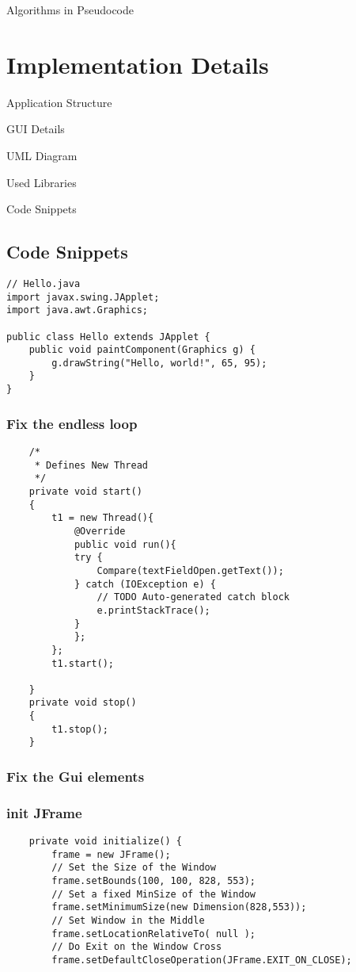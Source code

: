 \documentclass[10pt,a4paper]{article}
\begin{document}
Algorithms in Pseudocode


\section{Implementation Details}


 Application Structure

     GUI Details

     UML Diagram

     Used Libraries

     Code Snippets
     
     
 \subsection{Code Snippets}
 \begin{lstlisting}
// Hello.java
import javax.swing.JApplet;
import java.awt.Graphics;

public class Hello extends JApplet {
    public void paintComponent(Graphics g) {
        g.drawString("Hello, world!", 65, 95);
    }    
}
\end{lstlisting}

\subsubsection{Fix the endless loop}


\begin{lstlisting}
	/*
	 * Defines New Thread 
	 */
	private void start() 
	{
		t1 = new Thread(){
			@Override
			public void run(){
			try {
				Compare(textFieldOpen.getText());
			} catch (IOException e) {
				// TODO Auto-generated catch block
				e.printStackTrace();
			}
			};
		};
		t1.start();
		
	}
	private void stop()
	{
		t1.stop();
	}
\end{lstlisting}
\subsubsection{Fix the Gui elements}
\subsubsection*{init JFrame}
\begin{lstlisting}
	private void initialize() {
		frame = new JFrame();
		// Set the Size of the Window
		frame.setBounds(100, 100, 828, 553);
		// Set a fixed MinSize of the Window
		frame.setMinimumSize(new Dimension(828,553));			
		// Set Window in the Middle
		frame.setLocationRelativeTo( null );			
		// Do Exit on the Window Cross
		frame.setDefaultCloseOperation(JFrame.EXIT_ON_CLOSE);
				
\end{lstlisting}
\end{document}
